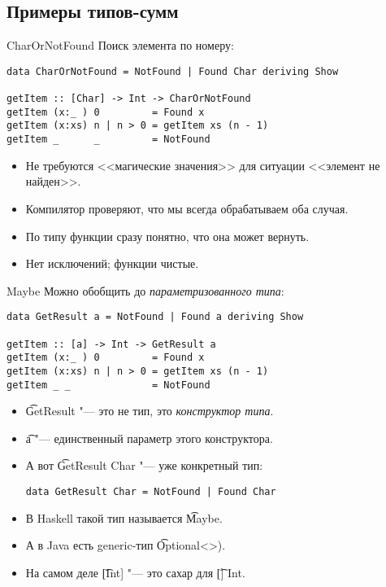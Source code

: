 \subsection{Примеры типов-сумм}
\begin{frame}
\end{frame}

\begin{frame}[fragile]{CharOrNotFound}
	Поиск элемента по номеру:
\begin{verbatim}
data CharOrNotFound = NotFound | Found Char deriving Show

getItem :: [Char] -> Int -> CharOrNotFound
getItem (x:_ ) 0         = Found x
getItem (x:xs) n | n > 0 = getItem xs (n - 1)
getItem _      _         = NotFound
\end{verbatim}
	\begin{itemize}
		\item Не требуются <<магические значения>> для ситуации <<элемент не найден>>.
		\item Компилятор проверяют, что мы всегда обрабатываем оба случая.
		\item По типу функции сразу понятно, что она может вернуть.
		\item Нет исключений; функции чистые.
	\end{itemize}	
\end{frame}


\begin{frame}[fragile]{Maybe}
	Можно обобщить до \textit{параметризованного типа}:
\begin{verbatim}
data GetResult a = NotFound | Found a deriving Show

getItem :: [a] -> Int -> GetResult a
getItem (x:_ ) 0         = Found x
getItem (x:xs) n | n > 0 = getItem xs (n - 1)
getItem _ _              = NotFound
\end{verbatim}
	\begin{itemize}
		\item \t{GetResult} "--- это не тип, это \textit{конструктор типа}.
		\item \t{a} "--- единственный параметр этого конструктора.
		\item А вот \t{GetResult Char} "--- уже конкретный тип:
\begin{verbatim}
data GetResult Char = NotFound | Found Char
\end{verbatim}
		\item В Haskell такой тип называется \t{Maybe}.
		\item А в Java есть generic-тип \t{Optional<>}).
		\item На самом деле \t{[Int]} "--- это сахар для \t{[] Int}.
	\end{itemize}
\end{frame}


